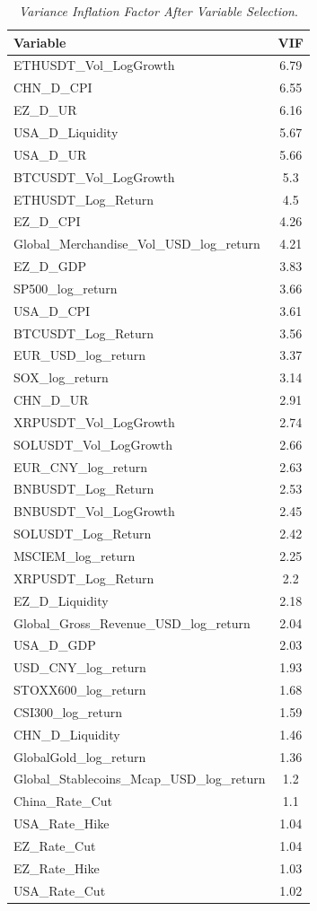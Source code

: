 \begin{table}[h]
  \centering
  \caption{\textit{Variance Inflation Factor After Variable Selection}.}
  \label{tab:vif_after}
  \begin{tabular}{lc}
    \toprule
    \textbf{Variable} & \textbf{VIF} \\ 
    \midrule
    ETHUSDT\_Vol\_LogGrowth & 6.79 \\ 
    CHN\_D\_CPI & 6.55 \\ 
    EZ\_D\_UR & 6.16 \\ 
    USA\_D\_Liquidity & 5.67 \\ 
    USA\_D\_UR & 5.66 \\ 
    BTCUSDT\_Vol\_LogGrowth & 5.3 \\ 
    ETHUSDT\_Log\_Return & 4.5 \\ 
    EZ\_D\_CPI & 4.26 \\ 
    Global\_Merchandise\_Vol\_USD\_log\_return & 4.21 \\ 
    EZ\_D\_GDP & 3.83 \\ 
    SP500\_log\_return & 3.66 \\ 
    USA\_D\_CPI & 3.61 \\ 
    BTCUSDT\_Log\_Return & 3.56 \\ 
    EUR\_USD\_log\_return & 3.37 \\ 
    SOX\_log\_return & 3.14 \\ 
    CHN\_D\_UR & 2.91 \\ 
    XRPUSDT\_Vol\_LogGrowth & 2.74 \\ 
    SOLUSDT\_Vol\_LogGrowth & 2.66 \\ 
    EUR\_CNY\_log\_return & 2.63 \\ 
    BNBUSDT\_Log\_Return & 2.53 \\ 
    BNBUSDT\_Vol\_LogGrowth & 2.45 \\ 
    SOLUSDT\_Log\_Return & 2.42 \\ 
    MSCIEM\_log\_return & 2.25 \\ 
    XRPUSDT\_Log\_Return & 2.2 \\ 
    EZ\_D\_Liquidity & 2.18 \\ 
    Global\_Gross\_Revenue\_USD\_log\_return & 2.04 \\ 
    USA\_D\_GDP & 2.03 \\ 
    USD\_CNY\_log\_return & 1.93 \\ 
    STOXX600\_log\_return & 1.68 \\ 
    CSI300\_log\_return & 1.59 \\ 
    CHN\_D\_Liquidity & 1.46 \\ 
    GlobalGold\_log\_return & 1.36 \\ 
    Global\_Stablecoins\_Mcap\_USD\_log\_return & 1.2 \\ 
    China\_Rate\_Cut & 1.1 \\ 
    USA\_Rate\_Hike & 1.04 \\ 
    EZ\_Rate\_Cut & 1.04 \\ 
    EZ\_Rate\_Hike & 1.03 \\ 
    USA\_Rate\_Cut & 1.02 \\ 
    \bottomrule
  \end{tabular}
\end{table}